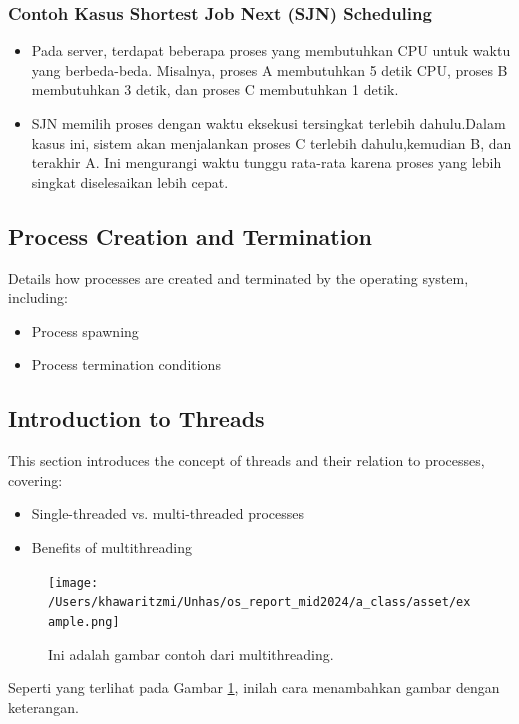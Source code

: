 \documentclass[12pt]{article}
\begin{document}
\subsubsection{Contoh Kasus Shortest Job Next (SJN) Scheduling}
    \begin{itemize}
        \item Pada server, terdapat beberapa proses yang membutuhkan CPU untuk waktu yang berbeda-beda. Misalnya, proses A membutuhkan 5 detik CPU, proses B membutuhkan 3 detik, dan proses C membutuhkan 1 detik.
        \item SJN memilih proses dengan waktu eksekusi tersingkat terlebih dahulu.Dalam kasus ini, sistem akan menjalankan proses C terlebih dahulu,kemudian B, dan terakhir A. Ini mengurangi waktu tunggu rata-rata karena proses yang lebih singkat diselesaikan lebih cepat.
    \end{itemize} 


 
    
\subsection{Process Creation and Termination}
Details how processes are created and terminated by the operating system, including:
\begin{itemize}
    \item Process spawning
    \item Process termination conditions
\end{itemize}

\subsection{Introduction to Threads}
This section introduces the concept of threads and their relation to processes, covering:
\begin{itemize}
    \item Single-threaded vs. multi-threaded processes
    \item Benefits of multithreading
\end{itemize}

\begin{figure}[h]
    \centering
    \texttt{[image: /Users/khawaritzmi/Unhas/os\_report\_mid2024/a\_class/asset/example.png]}  %
    \caption{Ini adalah gambar contoh dari multithreading.}
    \label{fig:contoh_gambar}
\end{figure}

Seperti yang terlihat pada Gambar \ref{fig:contoh_gambar}, inilah cara menambahkan gambar dengan keterangan.
\end{document}
